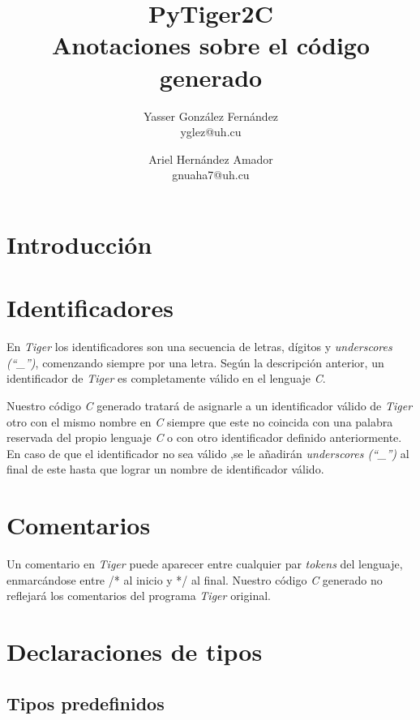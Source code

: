 \documentclass{article}
\title{
    \LARGE{PyTiger2C} \\
    \Large{Anotaciones sobre el código generado}
}
\author{
    Yasser González Fernández \\
    \small{yglez@uh.cu}
    \and
    Ariel Hernández Amador \\
    \small{gnuaha7@uh.cu}
}
\date{}
\begin{document}
\maketitle

\thispagestyle{empty}

\newpage

\setcounter{page}{1}

\section{Introducción}


\section{Identificadores}

En \textit{Tiger} los identificadores son una secuencia de letras, dígitos y
\textit{underscores (``\_'')}, comenzando siempre por una letra. Según la
descripción anterior, un identificador de \textit{Tiger} es completamente
válido en el lenguaje \textit{C}.

Nuestro código \textit{C} generado tratará de asignarle a un identificador
válido de \textit{Tiger} otro con el mismo nombre en \textit{C} siempre que
este no coincida con una palabra reservada del propio lenguaje \textit{C} o con
otro identificador definido anteriormente. En caso de que el identificador no
sea válido ,se le añadirán \textit{underscores (``\_'')} al final de este hasta
que lograr un nombre de identificador válido.

\section{Comentarios}

Un comentario en \textit{Tiger} puede aparecer entre cualquier par
\textit{tokens} del lenguaje, enmarcándose entre /* al inicio y */ al final.
Nuestro código \textit{C} generado no reflejará los comentarios del programa
\textit{Tiger} original.

\section{Declaraciones de tipos}


\subsection{Tipos predefinidos}
\end{document}
